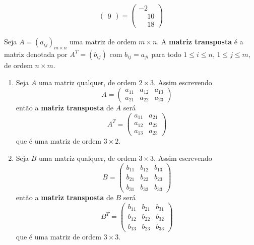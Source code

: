 \begin{observacao}
\begin{align*}
\begin{pmatrix}
        9\end{pmatrix} = \begin{pmatrix}-2\\\phantom{-}10\\\phantom{-}18\end{pmatrix}
    \end{align*}
\end{observacao}

\begin{definicao}
    Seja $A = (a_{ij})_{m \times n}$ uma matriz de ordem $m \times n$. A \textbf{matriz transposta} é a matriz
    denotada por $A^T = (b_{ij})$ com $b_{ij} = a_{ji}$ para todo $1 \le i \le n$, $1 \le j \le m$, de ordem $n \times m$.
\end{definicao}

\begin{exemplos}
    \begin{enumerate}
        \item Seja $A$ uma matriz qualquer, de ordem $2 \times 3$.
            Assim escrevendo
            \[
                A = \begin{pmatrix}
                        a_{11} & a_{12} & a_{13}\\
                        a_{21} & a_{22} & a_{23}
                    \end{pmatrix}
            \]
            então a \textbf{matriz transposta} de $A$ será
            \[
                A^T = \begin{pmatrix}
                        a_{11} & a_{21}\\
                        a_{12} & a_{22}\\
                        a_{13} & a_{23}
                    \end{pmatrix}
            \]
            que é uma matriz de ordem $3 \times 2$.

        \item Seja $B$ uma matriz qualquer, de ordem $3 \times 3$.
            Assim escrevendo
            \[
                B = \begin{pmatrix}
                        b_{11} & b_{12} & b_{13}\\
                        b_{21} & b_{22} & b_{23}\\
                        b_{31} & b_{32} & b_{33}
                    \end{pmatrix}
            \]
            então a \textbf{matriz transposta} de $B$ será
            \[
                B^T = \begin{pmatrix}
                        b_{11} & b_{21} & b_{31}\\
                        b_{12} & b_{22} & b_{32}\\
                        b_{13} & b_{23} & b_{33}
                    \end{pmatrix}
            \]
            que é uma matriz de ordem $3 \times 3$.


\end{enumerate}
\end{exemplos}

